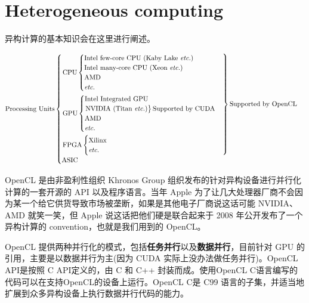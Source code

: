 \section{Heterogeneous computing}


异构计算的基本知识会在这里进行阐述。


$$\text{Processing Units} \begin{cases}
    \begin{rcases}
        \text{CPU} 
            \begin{cases}
                \text{Intel few-core CPU (Kaby Lake \textit{etc.})}\\
                \text{Intel many-core CPU (Xeon \textit{etc.})}\\
                \text{AMD}\\
                \text{\textit{etc.}}
            \end{cases} 
        \\
        \text{GPU} 
            \begin{cases}
                \text{Intel Integrated GPU}\\
                \begin{rcases} \text{NVIDIA (Titan \textit{etc.})} \end{rcases}  \text{Supported by CUDA}\\
                \text{AMD}\\
                \textit{etc.}
            \end{cases}
        \\
        \text{FPGA}
            \begin{cases}
                \text{Xilinx}\\
                \textit{etc.}
            \end{cases}
    \end{rcases} \text{Supported by OpenCL}
    \\
    \text{ASIC}
\end{cases}$$

OpenCL 是由非盈利性组织 Khronos Group 组织发布的针对异构设备进行并行化计算的一套开源的 API 以及程序语言。当年 Apple 为了让几大处理器厂商不会因为某一个给它供货导致市场被垄断，如果是其他电子厂商说这话可能 NVIDIA、 AMD 就笑一笑，但 Apple 说这话把他们硬是联合起来于 2008 年公开发布了一个异构计算的 convention，也就是我们用到的 OpenCL。

OpenCL 提供两种并行化的模式，包括\textbf{任务并行}以及\textbf{数据并行}，目前针对 GPU 的引用，主要是以数据并行为主(因为 CUDA 实际上没办法做任务并行)。OpenCL API是按照 C API定义的，由 C 和 C++ 封装而成。使用OpenCL C语言编写的代码可以在支持OpenCL的设备上运行。OpenCL C是 C99 语言的子集，并适当地扩展到众多异构设备上执行数据并行代码的能力。

